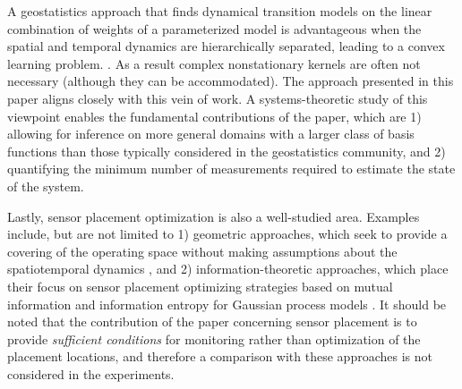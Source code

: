 A geostatistics approach that finds dynamical transition models on the linear combination of weights of a parameterized model \cite{cressie2011statistics,mardia1998kriged} is advantageous when the spatial and temporal dynamics are hierarchically separated, leading to a convex learning problem. . As a result complex nonstationary kernels are often not necessary (although they can be accommodated). The approach presented in this paper aligns closely with this vein of work. %
A systems-theoretic study of this viewpoint enables the fundamental contributions of the paper, which are 1) allowing for inference on more general domains with a larger class of basis functions than those typically considered in the geostatistics community, and 2) quantifying the minimum number of measurements required to estimate the state of the system. 



Lastly, sensor placement optimization is also a well-studied area. Examples include, but are not limited to 1) geometric approaches, which seek to provide a covering of the operating space without making assumptions about the spatiotemporal dynamics \cite{egerstedt:bk:2010}, and 2) information-theoretic approaches, which place their focus on sensor placement optimizing strategies based on mutual information and information entropy for Gaussian process models \cite{Guestrin05_ICML}.
It should be noted that the contribution of the paper concerning sensor placement is to provide \emph{sufficient conditions} for monitoring rather than optimization of the placement locations, and therefore a comparison with these approaches is not considered in the experiments. 

